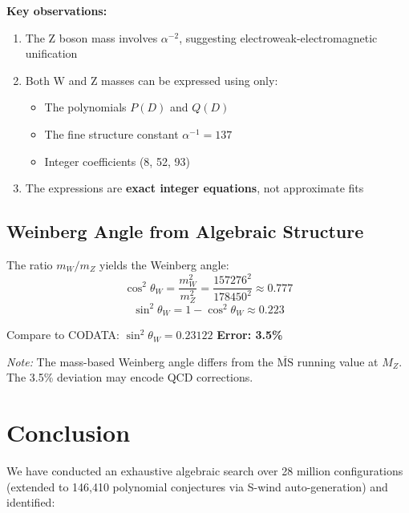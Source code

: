 \documentclass[11pt,a4paper]{article}
\begin{document}
\textbf{Key observations:}
\begin{enumerate}
    \item The Z boson mass involves $\alpha^{-2}$, suggesting electroweak-electromagnetic unification
    \item Both W and Z masses can be expressed using only:
    \begin{itemize}
        \item The polynomials $P(D)$ and $Q(D)$
        \item The fine structure constant $\alpha^{-1} = 137$
        \item Integer coefficients (8, 52, 93)
    \end{itemize}
    \item The expressions are \textbf{exact integer equations}, not approximate fits
\end{enumerate}

\subsection{Weinberg Angle from Algebraic Structure}

The ratio $m_W/m_Z$ yields the Weinberg angle:
\[
\cos^2\theta_W = \frac{m_W^2}{m_Z^2} = \frac{157276^2}{178450^2} \approx 0.777
\]
\[
\sin^2\theta_W = 1 - \cos^2\theta_W \approx 0.223
\]

Compare to CODATA: $\sin^2\theta_W = 0.23122$ \quad \textbf{Error: 3.5\%}

\textit{Note:} The mass-based Weinberg angle differs from the $\overline{\text{MS}}$ running value at $M_Z$. The 3.5\% deviation may encode QCD corrections.

\section{Conclusion}

We have conducted an exhaustive algebraic search over 28 million configurations (extended to 146,410 polynomial conjectures via S-wind auto-generation) and identified:
\end{document}
